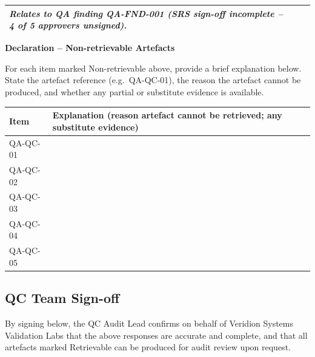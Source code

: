 \documentclass[11pt,a4paper]{article}
\newcommand{\checkbox}{\makebox[1em]{\Square}}
\begin{document}
\begin{longtable}{|p{}|p{}|p{}|}
\textit{Relates to QA finding QA-FND-001 (SRS sign-off incomplete -- 4 of 5 approvers unsigned).} &
\centering\checkbox &
\centering\checkbox \tabularnewline
\hline

\end{longtable}

\vspace{0.3cm}

\noindent\colorbox{declarebox}{\begin{minipage}{\dimexpr\textwidth-2\fboxsep\relax}
\textbf{Declaration -- Non-retrievable Artefacts}

\medskip
For each item marked Non-retrievable above, provide a brief explanation below. State the artefact reference (e.g.\ QA-QC-01), the reason the artefact cannot be produced, and whether any partial or substitute evidence is available.
\end{minipage}}

\vspace{0.3cm}

\renewcommand{\arraystretch}{1.4}
\begin{longtable}{|p{}|p{}|}
\hline
\rowcolor{tableheader}
\textbf{Item} & \textbf{Explanation (reason artefact cannot be retrieved; any substitute evidence)} \\
\hline
\endhead

QA-QC-01 & \vspace{2.2cm} \tabularnewline
\hline
QA-QC-02 & \vspace{2.2cm} \tabularnewline
\hline
QA-QC-03 & \vspace{2.2cm} \tabularnewline
\hline
QA-QC-04 & \vspace{2.2cm} \tabularnewline
\hline
QA-QC-05 & \vspace{2.2cm} \tabularnewline
\hline
\end{longtable}

\vspace{0.3cm}

\subsection*{QC Team Sign-off}

\noindent By signing below, the QC Audit Lead confirms on behalf of Veridion Systems Validation Labs that the above responses are accurate and complete, and that all artefacts marked Retrievable can be produced for audit review upon request.
\end{document}
